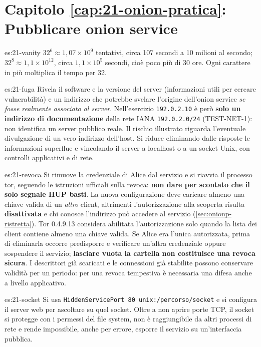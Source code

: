 \section*{Capitolo \ref{cap:21-onion-pratica}: Pubblicare onion service}

\begin{soluzione}{es:21-vanity}
$32^6 \approx 1{,}07 \times 10^9$ tentativi, circa 107 secondi a 10 milioni al secondo; $32^8 \approx 1{,}1 \times 10^{12}$, circa $1{,}1 \times 10^5$ secondi, cioè poco più di 30 ore. Ogni carattere in più moltiplica il tempo per 32.
\end{soluzione}

\begin{soluzione}{es:21-fuga}
Rivela il software e la versione del server (informazioni utili per cercare vulnerabilità) e un indirizzo che potrebbe svelare l'origine dell'onion service \emph{se fosse realmente associato al server}. Nell'esercizio \texttt{192.0.2.10} è però \textbf{solo un indirizzo di documentazione} della rete IANA \texttt{192.0.2.0/24} (TEST-NET-1): non identifica un server pubblico reale. Il rischio illustrato riguarda l'eventuale divulgazione di un vero indirizzo dell'host. Si riduce eliminando dalle risposte le informazioni superflue e vincolando il server a localhost o a un socket Unix, con controlli applicativi e di rete.
\end{soluzione}

\begin{soluzione}{es:21-revoca}
Si rimuove la credenziale di Alice dal servizio e si riavvia il processo tor, seguendo le istruzioni ufficiali sulla revoca: \textbf{non dare per scontato che il solo segnale HUP basti}. La nuova configurazione deve caricare almeno una chiave valida di un \emph{altro} client, altrimenti l'autorizzazione alla scoperta risulta \textbf{disattivata} e chi conosce l'indirizzo può accedere al servizio (\cref{sec:onionp-ristretta}). Tor 0.4.9.13 considera abilitata l'autorizzazione solo quando la lista dei client contiene almeno una chiave valida. Se Alice era l'unica autorizzata, prima di eliminarla occorre predisporre e verificare un'altra credenziale oppure sospendere il servizio; \textbf{lasciare vuota la cartella non costituisce una revoca sicura}. I descrittori già scaricati e le connessioni già stabilite possono conservare validità per un periodo: per una revoca tempestiva è necessaria una difesa anche a livello applicativo.
\end{soluzione}

\begin{soluzione}{es:21-socket}
Si usa \texttt{HiddenServicePort 80 unix:/percorso/socket} e si configura il server web per ascoltare su quel socket. Oltre a non aprire porte TCP, il socket si protegge con i permessi del file system, non è raggiungibile da altri processi di rete e rende impossibile, anche per errore, esporre il servizio su un'interfaccia pubblica.
\end{soluzione}

